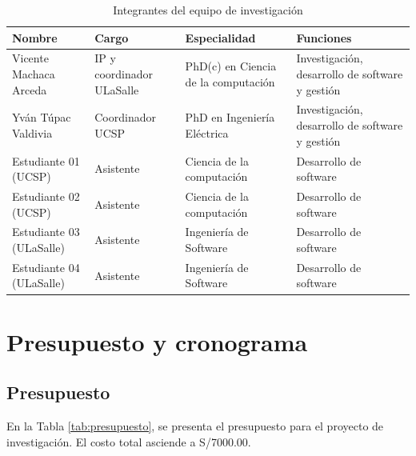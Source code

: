 \documentclass[a4paper,11pt]{article}
\begin{document}
\begin{table}[H]
\caption{Integrantes del equipo de investigación}
\label{tab:integrantes}
\centering
\setlength{\tabcolsep}{0.5em} %
{\renewcommand{\arraystretch}{1.7}%
{\small
\begin{tabular}{|p{4cm}p{4cm}p{3.5cm}p{4.8cm}|}  \hline
\textbf{Nombre} & \textbf{Cargo}          & \textbf{Especialidad} & \textbf{Funciones} \\ \hline
Vicente Machaca Arceda     & IP y coordinador ULaSalle   & PhD(c) en Ciencia de la computación & Investigación, desarrollo de software y gestión      \\
Yván Túpac Valdivia   & Coordinador   UCSP           & PhD en Ingeniería Eléctrica    & Investigación, desarrollo de software y gestión \\
Estudiante 01 (UCSP)              & Asistente         &    Ciencia de la computación           & Desarrollo   de software                      \\
Estudiante 02 (UCSP)              & Asistente           &    Ciencia de la computación      & Desarrollo  de software        \\    

Estudiante 03 (ULaSalle)              & Asistente         &      Ingeniería de Software         & Desarrollo de software                        \\
Estudiante 04     (ULaSalle)          & Asistente           &   Ingeniería de Software       & Desarrollo de software         \\  \hline              
\end{tabular}
}
}
\end{table}



\section{Presupuesto y cronograma}

\subsection{Presupuesto}
En la Tabla \ref{tab:presupuesto}, se presenta el presupuesto para el proyecto de investigación. El costo total asciende a S/7000.00. 
\end{document}
